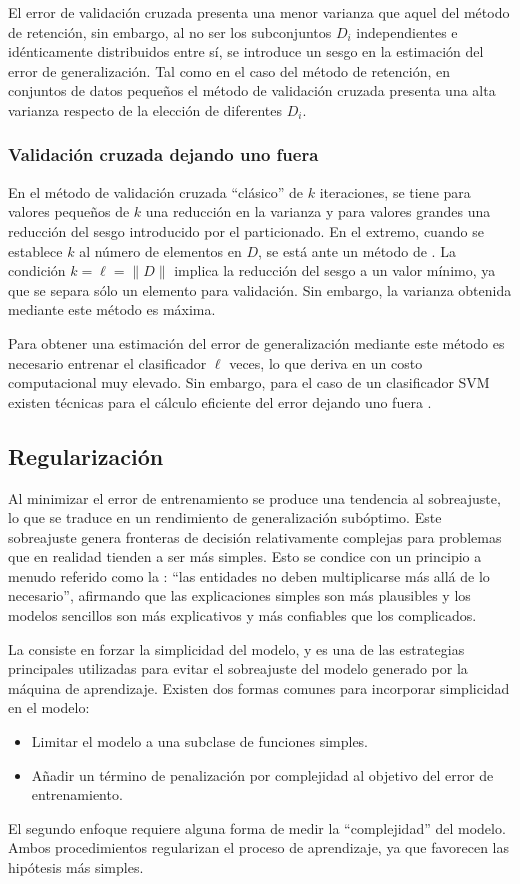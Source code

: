 El error de validación cruzada presenta una menor varianza que aquel
del método de retención, sin embargo, al no ser los subconjuntos $D_i$
independientes e idénticamente distribuidos entre sí, se introduce un
sesgo en la estimación del error de generalización.  Tal como en el
caso del método de retención, en conjuntos de datos pequeños el método
de validación cruzada presenta una alta varianza respecto de la
elección de diferentes $D_i$.
%
\subsubsection{Validación cruzada dejando uno fuera}
%
En el método de validación cruzada ``clásico'' de $k$ iteraciones, se
tiene para valores pequeños de $k$ una reducción en la varianza y para
valores grandes una reducción del sesgo introducido por el particionado.
En el extremo, cuando se
establece $k$ al número de elementos en $D$, se está ante un método de
. La condición $k=\ell=\|D\|$
implica la reducción del sesgo a un valor mínimo, ya que se separa
sólo un elemento para validación. Sin embargo, la varianza obtenida
mediante este método es máxima.

Para obtener una estimación del error de generalización mediante este
método es necesario entrenar el clasificador $\ell$ veces, lo que deriva
en un costo computacional muy elevado. Sin embargo, para el caso de un
clasificador SVM existen técnicas para el cálculo eficiente del error
dejando uno fuera \cite{chapelle,lee-keerthi}.
%
%
\subsection{Regularización}
%
Al minimizar el error de entrenamiento se produce una tendencia al
sobreajuste, lo que se traduce en un rendimiento de generalización
subóptimo. Este sobreajuste genera fronteras de decisión relativamente
complejas para problemas que en realidad tienden a ser más simples.
Esto se condice con un principio a menudo referido como la :
``las entidades no deben multiplicarse más allá de lo necesario'',
afirmando que las explicaciones simples son más plausibles y los
modelos sencillos son más explicativos y más confiables que los
complicados.

La  consiste en forzar la simplicidad del modelo, y es
una de las estrategias principales utilizadas para evitar el
sobreajuste del modelo generado por la máquina de aprendizaje. Existen
dos formas comunes para incorporar simplicidad en el modelo:
%
\begin{itemize}
\item Limitar el modelo a una subclase de funciones simples.
\item Añadir un término de penalización por complejidad al objetivo
  del error de entrenamiento.
\end{itemize}
%
El segundo enfoque requiere alguna forma de medir la ``complejidad'' del
modelo. Ambos procedimientos regularizan el proceso de aprendizaje, ya
que favorecen las hipótesis más simples.

